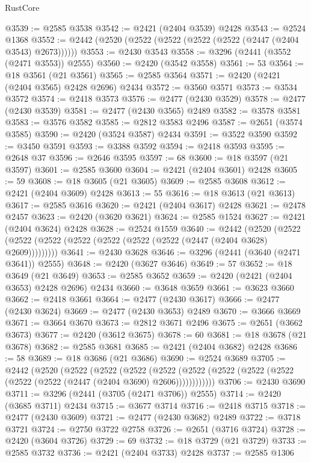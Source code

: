 \begin{lexlean}{RustCore}
\begin{coremodule}
@3539 := @2585 @3538
@3542 := @2421 (@2404 @3539) @2428
@3543 := @2524 @1368
@3552 := @2442 (@2520 (@2522 (@2522 (@2522 (@2522 (@2447 (@2404 @3543) @2673))))))
@3553 := @2430 @3543
@3558 := @3296 (@2441 (@3552 (@2471 @3553)) @2555)
@3560 := @2420 (@3542 @3558)
@3561 := 53
@3564 := @18 @3561 (@21 @3561)
@3565 := @2585 @3564
@3571 := @2420 (@2421 (@2404 @3565) @2428 @2696) @2434
@3572 := @3560 @3571
@3573 := @3534 @3572
@3574 := @2418 @3573
@3576 := @2477 (@2430 @3529)
@3578 := @2477 (@2430 @3539)
@3581 := @2477 (@2430 @3565) @2489
@3582 := @3578 @3581
@3583 := @3576 @3582
@3585 := @2812 @3583 @2496
@3587 := @2651 (@3574 @3585)
@3590 := @2420 (@3524 @3587) @2434
@3591 := @3522 @3590
@3592 := @3450 @3591
@3593 := @3388 @3592
@3594 := @2418 @3593
@3595 := @2648 @37
@3596 := @2646 @3595
@3597 := 68
@3600 := @18 @3597 (@21 @3597)
@3601 := @2585 @3600
@3604 := @2421 (@2404 @3601) @2428
@3605 := 59
@3608 := @18 @3605 (@21 @3605)
@3609 := @2585 @3608
@3612 := @2421 (@2404 @3609) @2428
@3613 := 55
@3616 := @18 @3613 (@21 @3613)
@3617 := @2585 @3616
@3620 := @2421 (@2404 @3617) @2428
@3621 := @2478 @2457
@3623 := @2420 (@3620 @3621)
@3624 := @2585 @1524
@3627 := @2421 (@2404 @3624) @2428
@3628 := @2524 @1559
@3640 := @2442
    (@2520 (@2522 (@2522 (@2522 (@2522 (@2522 (@2522 (@2522 (@2447 (@2404 @3628) @2609)))))))))
@3641 := @2430 @3628
@3646 := @3296 (@2441 (@3640 (@2471 @3641)) @2555)
@3648 := @2420 (@3627 @3646)
@3649 := 57
@3652 := @18 @3649 (@21 @3649)
@3653 := @2585 @3652
@3659 := @2420 (@2421 (@2404 @3653) @2428 @2696) @2434
@3660 := @3648 @3659
@3661 := @3623 @3660
@3662 := @2418 @3661
@3664 := @2477 (@2430 @3617)
@3666 := @2477 (@2430 @3624)
@3669 := @2477 (@2430 @3653) @2489
@3670 := @3666 @3669
@3671 := @3664 @3670
@3673 := @2812 @3671 @2496
@3675 := @2651 (@3662 @3673)
@3677 := @2420 (@3612 @3675)
@3678 := 60
@3681 := @18 @3678 (@21 @3678)
@3682 := @2585 @3681
@3685 := @2421 (@2404 @3682) @2428
@3686 := 58
@3689 := @18 @3686 (@21 @3686)
@3690 := @2524 @3689
@3705 := @2442
    (@2520
      (@2522
        (@2522
          (@2522
            (@2522 (@2522 (@2522 (@2522 (@2522 (@2522 (@2522 (@2447 (@2404 @3690) @2606))))))))))))
@3706 := @2430 @3690
@3711 := @3296 (@2441 (@3705 (@2471 @3706)) @2555)
@3714 := @2420 (@3685 @3711) @2434
@3715 := @3677 @3714
@3716 := @2418 @3715
@3718 := @2477 (@2430 @3609)
@3721 := @2477 (@2430 @3682) @2489
@3722 := @3718 @3721
@3724 := @2750 @3722 @2758
@3726 := @2651 (@3716 @3724)
@3728 := @2420 (@3604 @3726)
@3729 := 69
@3732 := @18 @3729 (@21 @3729)
@3733 := @2585 @3732
@3736 := @2421 (@2404 @3733) @2428
@3737 := @2585 @1306

\end{coremodule}
\end{lexlean}
